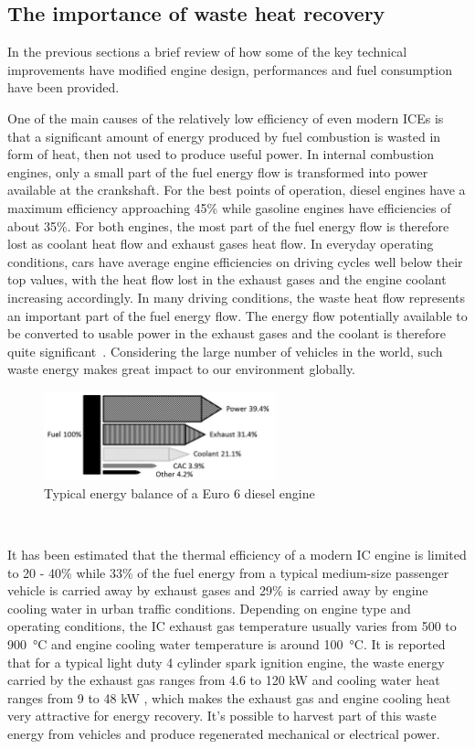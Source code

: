 \subsection{The importance of waste heat recovery}

In the previous sections a brief review of how some of the key technical improvements have modified engine design, performances and fuel consumption have been provided.

One of the main causes of the relatively low efficiency of even modern ICEs is that a significant amount of energy produced by fuel combustion is wasted in form of heat, then not used to produce useful power. In internal combustion engines, only a small part of the fuel energy flow is transformed into power available at the crankshaft. For the best points of operation, diesel engines have a maximum efficiency approaching 45\% while gasoline engines have efficiencies of about 35\%. For both engines, the most part of the fuel energy flow is therefore lost as coolant heat flow and exhaust gases heat flow. In everyday operating conditions, cars have average engine efficiencies on driving cycles well below their top values, with the heat flow lost in the exhaust gases and the engine coolant increasing accordingly. In many driving conditions, the waste heat flow represents an important part of the fuel energy flow. The energy flow potentially available to be converted to usable power in the exhaust gases and the coolant is therefore quite significant~\cite{Boretti2012}. Considering the large number of vehicles in the world, such waste energy makes great impact to our environment globally.

\begin{figure}[ht]
  \centering
  \includegraphics[width=0.6\textwidth]{figures/review/sankey.png}
  \caption{Typical energy balance of a Euro 6 diesel engine\label{fig:sankey_energy} }
\end{figure}
~

It has been estimated that the thermal efficiency of a modern IC engine is limited to 20 - 40\% while 33\% of the fuel energy from a typical medium-size passenger vehicle is carried away by exhaust gases and 29\% is carried away by engine cooling water in urban traffic conditions. Depending on engine type and operating conditions, the IC exhaust gas temperature usually varies from 500 to \SI{900}{\celsius} and engine cooling water temperature is around \SI{100}{\celsius}. It is reported that for a typical light duty 4 cylinder spark ignition engine, the waste energy carried by the exhaust gas ranges from 4.6 to 120 kW and cooling water heat ranges from 9 to 48 kW \cite{ElChammas2005}, which makes the exhaust gas and engine cooling heat very attractive for energy recovery. It's possible to harvest part of this waste energy from vehicles and produce regenerated mechanical or electrical power.

